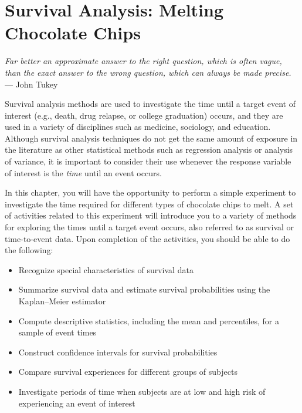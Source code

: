 \documentclass[
]{report}
\providecommand{\tightlist}{%
  \setlength{\itemsep}{0pt}\setlength{\parskip}{0pt}}
\begin{document}
\chapter{Survival Analysis: Melting Chocolate Chips}\label{survival-analysis-melting-chocolate-chips}

\emph{Far better an approximate answer to the right question, which is often vague, than the exact answer to the wrong question, which can always be made precise.}\\
--- John Tukey

Survival analysis methods are used to investigate the time until a target event of interest (e.g., death, drug relapse, or college graduation) occurs, and they are used in a variety of disciplines such as medicine, sociology, and education. Although survival analysis techniques do not get the same amount of exposure in the literature as other statistical methods such as regression analysis or analysis of variance, it is important to consider their use whenever the response variable of interest is the \emph{time} until an event occurs.

In this chapter, you will have the opportunity to perform a simple experiment to investigate the time required for different types of chocolate chips to melt. A set of activities related to this experiment will introduce you to a variety of methods for exploring the times until a target event occurs, also referred to as survival or time-to-event data. Upon completion of the activities, you should be able to do the following:

\begin{itemize}
\tightlist
\item
  Recognize special characteristics of survival data\\
\item
  Summarize survival data and estimate survival probabilities using the Kaplan--Meier estimator\\
\item
  Compute descriptive statistics, including the mean and percentiles, for a sample of event times\\
\item
  Construct confidence intervals for survival probabilities\\
\item
  Compare survival experiences for different groups of subjects\\
\item
  Investigate periods of time when subjects are at low and high risk of experiencing an event of interest
\end{itemize}
\end{document}
